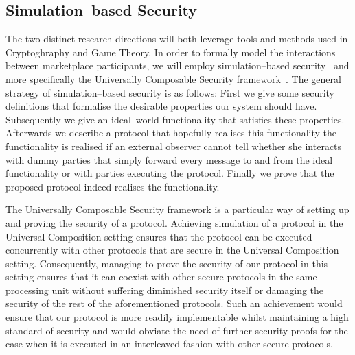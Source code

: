 \subsection{Simulation--based Security}
  The two distinct research directions will both leverage tools and methods used in
  Cryptoghraphy and Game Theory. In order to formally model the interactions between
  marketplace participants, we will employ simulation--based security~\cite{simulate}
  and more specifically the Universally Composable Security framework~\cite{uc}. The
  general strategy of simulation--based security is as follows: First we give some
  security definitions that formalise the desirable properties our system should have.
  Subsequently we give an ideal--world functionality that satisfies these properties.
  Afterwards we describe a protocol that hopefully realises this functionality the
  functionality is realised if an external observer cannot tell whether she interacts
  with dummy parties that simply forward every message to and from the ideal
  functionality or with parties executing the protocol. Finally we prove that the
  proposed protocol indeed realises the functionality.

  The Universally Composable Security framework is a particular way of setting up and
  proving the security of a protocol. Achieving simulation of a protocol in the
  Universal Composition setting ensures that the protocol can be executed concurrently
  with other protocols that are secure in the Universal Composition setting.
  Consequently, managing to prove the security of our protocol in this setting ensures
  that it can coexist with other secure protocols in the same processing unit without
  suffering diminished security itself or damaging the security of the rest of the
  aforementioned protocols. Such an achievement would ensure that our protocol is more
  readily implementable whilst maintaining a high standard of security and would obviate
  the need of further security proofs for the case when it is executed in an interleaved
  fashion with other secure protocols.
